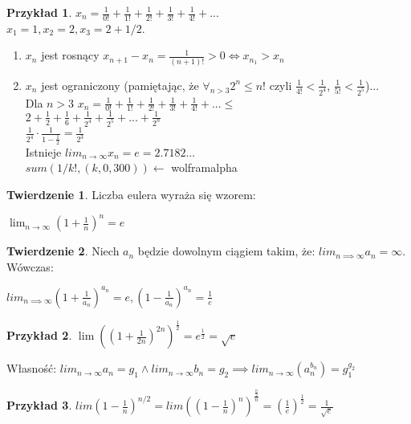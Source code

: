 \documentclass{article}
\theoremstyle{definition}
\theoremstyle{definition}
\newtheorem{tw}{Twierdzenie}[subsection]
\theoremstyle{definition}
\newtheorem{pk}{Przykład}[subsection]
\theoremstyle{definition}
\begin{document}
\begin{pk}
$x_n = \frac{1}{0!} + \frac{1}{1!} + \frac{1}{2!} + \frac{1}{3!} + \frac{1}{4!} + ...$\\
$x_1 = 1, x_2 = 2, x_3 = 2 + 1/2$.
\begin{enumerate}
    \item $x_n$ jest rosnący $x_{n+1}-x_n=\frac{1}{(n+1)!}>0 \iff x_{n_1}>x_n$
    \item $x_n$ jest ograniczony (pamiętając, że $\forall_{n>3} 2^n\leq n!$
    czyli $\frac{1}{4!} < \frac{1}{2^4}$, $\frac{1}{5!} < \frac{1}{2^5}$)...\\
    Dla $n>3$ $x_n=\frac{1}{0!} + \frac{1}{1!} + \frac{1}{2!} + \frac{1}{3!} + \frac{1}{4!} + ...\leq$\\
    $2+\frac{1}{2}+\frac{1}{6}+\frac{1}{2^4}+\frac{1}{2^5}+...+\frac{1}{2^n}$\\
    $\frac{1}{2^4}\cdot\frac{1}{1-\frac{1}{2}}=\frac{1}{2^3}$\\
    Istnieje $lim_{n\rightarrow \infty} x_n = e = 2.7182...$\\
    $sum(1/k!, (k,0,300))\leftarrow$ wolframalpha
\end{enumerate}
\end{pk}

\begin{tw}
    Liczba eulera wyraża się wzorem:
    \begin{center}
    $\lim_{n\rightarrow \infty} (1+\frac{1}{n})^n = e$
    \end{center}
\end{tw}

\begin{tw}
    Niech $a_n$ będzie dowolnym ciągiem takim, że:
    $lim_{n\implies \infty} a_n = \infty$. Wówczas:\\
    \begin{center}
    $lim_{n\implies \infty} (1+\frac{1}{a_n})^{a_n} = e, (1-\frac{1}{a_n})^{a_n} = \frac{1}{e}$
    \end{center}
\end{tw}

\begin{pk}
    $\lim ((1+\frac{1}{2n})^{2n})^{\frac{1}{2}}=e^{\frac{1}{2}}=\sqrt{e}$
\end{pk}

Własność: $lim_{n\rightarrow \infty} a_n = g_1 \land lim_{n\rightarrow \infty} b_n = g_2 \implies lim_{n\rightarrow \infty} (a_n^{b_n})=g_1^{g_2}$

\begin{pk}
    $lim (1-\frac{1}{n})^{n/2}=lim \left((1-\frac{1}{n})^n\right)^{\frac{\frac{n}{2}}{n}}=(\frac{1}{e})^{\frac{1}{2}}=\frac{1}{\sqrt{e}}$
\end{pk}
\end{document}
